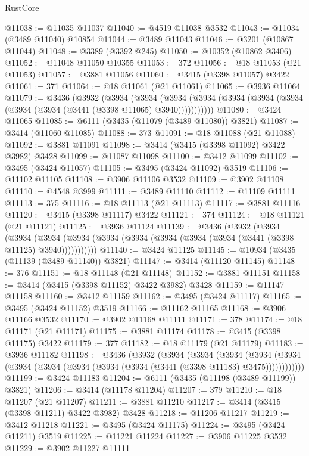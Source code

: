 \begin{lexlean}{RustCore}
\begin{coremodule}
@11038 := @11035 @11037
@11040 := @4519 @11038 @3532
@11043 := @11034 (@3489 @11040) @10854
@11044 := @3489 @11043
@11046 := @3201 (@10867 @11044)
@11048 := @3389 (@3392 @245)
@11050 := @10352 (@10862 @3406)
@11052 := @11048 @11050 @10355
@11053 := 372
@11056 := @18 @11053 (@21 @11053)
@11057 := @3881 @11056
@11060 := @3415 (@3398 @11057) @3422
@11061 := 371
@11064 := @18 @11061 (@21 @11061)
@11065 := @3936 @11064
@11079 := @3436
    (@3932
      (@3934
        (@3934
          (@3934 (@3934 (@3934 (@3934 (@3934 (@3934 (@3934 (@3441 (@3398 @11065) @3940)))))))))))
@11080 := @3424 @11065
@11085 := @6111 (@3435 (@11079 (@3489 @11080)) @3821)
@11087 := @3414 (@11060 @11085)
@11088 := 373
@11091 := @18 @11088 (@21 @11088)
@11092 := @3881 @11091
@11098 := @3414 (@3415 (@3398 @11092) @3422 @3982) @3428
@11099 := @11087 @11098
@11100 := @3412 @11099
@11102 := @3495 (@3424 @11057)
@11105 := @3495 (@3424 @11092) @3519
@11106 := @11102 @11105
@11108 := @3906 @11106 @3532
@11109 := @3902 @11108
@11110 := @4548 @3999
@11111 := @3489 @11110
@11112 := @11109 @11111
@11113 := 375
@11116 := @18 @11113 (@21 @11113)
@11117 := @3881 @11116
@11120 := @3415 (@3398 @11117) @3422
@11121 := 374
@11124 := @18 @11121 (@21 @11121)
@11125 := @3936 @11124
@11139 := @3436
    (@3932
      (@3934
        (@3934
          (@3934 (@3934 (@3934 (@3934 (@3934 (@3934 (@3934 (@3441 (@3398 @11125) @3940)))))))))))
@11140 := @3424 @11125
@11145 := @10934 (@3435 (@11139 (@3489 @11140)) @3821)
@11147 := @3414 (@11120 @11145)
@11148 := 376
@11151 := @18 @11148 (@21 @11148)
@11152 := @3881 @11151
@11158 := @3414 (@3415 (@3398 @11152) @3422 @3982) @3428
@11159 := @11147 @11158
@11160 := @3412 @11159
@11162 := @3495 (@3424 @11117)
@11165 := @3495 (@3424 @11152) @3519
@11166 := @11162 @11165
@11168 := @3906 @11166 @3532
@11170 := @3902 @11168 @11111
@11171 := 378
@11174 := @18 @11171 (@21 @11171)
@11175 := @3881 @11174
@11178 := @3415 (@3398 @11175) @3422
@11179 := 377
@11182 := @18 @11179 (@21 @11179)
@11183 := @3936 @11182
@11198 := @3436
    (@3932
      (@3934
        (@3934
          (@3934
            (@3934 (@3934 (@3934 (@3934 (@3934 (@3934 (@3934 (@3441 (@3398 @11183) @3475))))))))))))
@11199 := @3424 @11183
@11204 := @6111 (@3435 (@11198 (@3489 @11199)) @3821)
@11206 := @3414 (@11178 @11204)
@11207 := 379
@11210 := @18 @11207 (@21 @11207)
@11211 := @3881 @11210
@11217 := @3414 (@3415 (@3398 @11211) @3422 @3982) @3428
@11218 := @11206 @11217
@11219 := @3412 @11218
@11221 := @3495 (@3424 @11175)
@11224 := @3495 (@3424 @11211) @3519
@11225 := @11221 @11224
@11227 := @3906 @11225 @3532
@11229 := @3902 @11227 @11111

\end{coremodule}
\end{lexlean}
